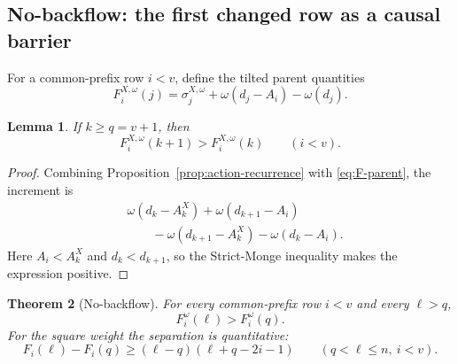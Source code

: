 \documentclass[11pt,a4paper]{amsart}
\numberwithin{equation}{section}
\theoremstyle{plain}
\newtheorem{theorem}{Theorem}[section]
\newtheorem{lemma}[theorem]{Lemma}
\theoremstyle{definition}
\begin{document}
\subsection{No-backflow: the first changed row as a causal barrier}\label{subsec:no-backflow}

For a common-prefix row \(i<v\), define the tilted parent quantities
\begin{equation}\label{eq:F-parent}
F_i^{X,\omega}(j)
=
\sigma_j^{X,\omega}
+
\omega(d_j-A_i)-\omega(d_j).
\end{equation}

\begin{lemma}\label{lem:tail-increase}
If \(k\ge q=v+1\), then
\[
F_i^{X,\omega}(k+1)>F_i^{X,\omega}(k)
\qquad(i<v).
\]
\end{lemma}

\begin{proof}
Combining Proposition~\ref{prop:action-recurrence} with \eqref{eq:F-parent}, the increment is
\[
\begin{aligned}
&\omega(d_k-A_k^X)+\omega(d_{k+1}-A_i)\\
&\qquad-
\omega(d_{k+1}-A_k^X)-\omega(d_k-A_i).
\end{aligned}
\]
Here \(A_i<A_k^X\) and \(d_k<d_{k+1}\), so the Strict-Monge inequality makes the expression positive.
\end{proof}

\begin{theorem}[No-backflow]\label{thm:no-backflow}
For every common-prefix row \(i<v\) and every \(\ell>q\),
\begin{equation}\label{eq:no-backflow}
F_i^\omega(\ell)>F_i^\omega(q).
\end{equation}
For the square weight the separation is quantitative:
\begin{equation}\label{eq:no-backflow-margin}
F_i(\ell)-F_i(q)
\ge
(\ell-q)(\ell+q-2i-1)
\qquad(q<\ell\le n,\ i<v).
\end{equation}
\end{theorem}
\end{document}
